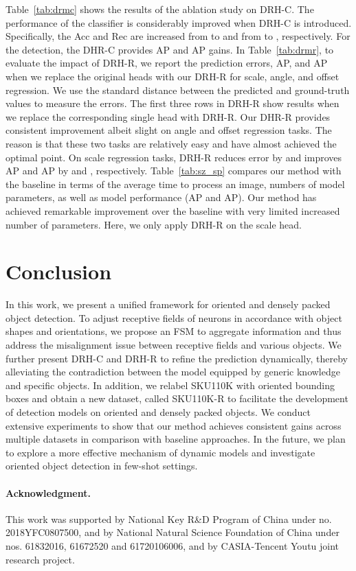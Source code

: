\documentclass[10pt,twocolumn,letterpaper]{article}
\begin{document}
Table~\ref{tab:drmc} shows the results of the ablation study on DRH-C.
The performance of the classifier is considerably improved when DRH-C is introduced.
Specifically, the Acc and Rec are increased from  to  and from  to , respectively.
For the detection, the DHR-C provides  AP and  AP gains.
In Table~\ref{tab:drmr}, to evaluate the impact of DRH-R, we report the prediction errors, AP, and AP when we replace the original heads with our DRH-R for scale, angle, and offset regression.
We use the standard  distance between the predicted and ground-truth values to measure the errors.
The first three rows in DRH-R show results when we replace the corresponding single head with DRH-R.
Our DHR-R provides consistent improvement albeit slight on angle and offset regression tasks. The reason is that these two tasks are relatively easy and have almost achieved the optimal point.
On scale regression tasks, DRH-R reduces  error by  and improves AP and AP by   and , respectively.
Table~\ref{tab:sz_sp} compares our method with the baseline in terms of the average time to process an image, numbers of model parameters, as well as model performance (AP and AP).
Our method has achieved remarkable improvement over the baseline with very limited increased number of parameters.
Here, we only apply DRH-R on the scale head.


\section{Conclusion}
\label{sec:conc}
In this work, we present a unified framework for oriented and densely packed object detection.
To adjust receptive fields of neurons in accordance with object shapes and orientations, we propose an FSM to aggregate information and thus address the misalignment issue between receptive fields and various objects.
We further present DRH-C and DRH-R to refine the prediction dynamically, thereby alleviating the contradiction between the model equipped by generic knowledge and specific objects.
In addition, we relabel SKU110K with oriented bounding boxes and obtain a new dataset, called SKU110K-R to facilitate the development of detection models on oriented and densely packed objects.
We conduct extensive experiments to show that our method achieves consistent gains across multiple datasets in comparison with baseline approaches.
In the future, we plan to explore a more effective mechanism of dynamic models and investigate oriented object detection in few-shot settings.

\small{
\paragraph{Acknowledgment.}
This work was supported by National Key R\&D Program of China under no. 2018YFC0807500, and by National Natural Science Foundation of China under nos. 61832016, 61672520 and 61720106006, and by CASIA-Tencent Youtu joint research project.
}

{\small


}
\end{document}

